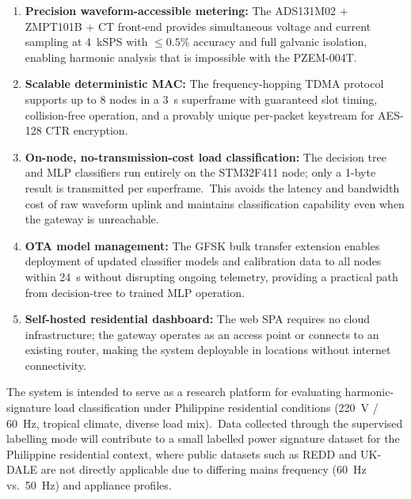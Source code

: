 \documentclass[conference]{IEEEtran}
\begin{document}
\begin{enumerate}
  \item \textbf{Precision waveform-accessible metering:} The
        ADS131M02 + ZMPT101B + CT front-end provides simultaneous
        voltage and current sampling at 4~kSPS with \(\le 0.5\%\)
        accuracy and full galvanic isolation, enabling harmonic analysis
        that is impossible with the PZEM-004T.

  \item \textbf{Scalable deterministic MAC:} The frequency-hopping
        TDMA protocol supports up to 8 nodes in a 3~s superframe with
        guaranteed slot timing, collision-free operation, and a
        provably unique per-packet keystream for AES-128 CTR
        encryption.

  \item \textbf{On-node, no-transmission-cost load classification:}
        The decision tree and MLP classifiers run entirely on the
        STM32F411 node; only a 1-byte result is transmitted per
        superframe.\ This avoids the latency and bandwidth cost of
        raw waveform uplink and maintains classification capability
        even when the gateway is unreachable.

  \item \textbf{OTA model management:} The GFSK bulk transfer
        extension enables deployment of updated classifier models and
        calibration data to all nodes within 24~s without disrupting
        ongoing telemetry, providing a practical path from
        decision-tree to trained MLP operation.

  \item \textbf{Self-hosted residential dashboard:} The web SPA
        requires no cloud infrastructure; the gateway operates as an
        access point or connects to an existing router, making the
        system deployable in locations without internet connectivity.
\end{enumerate}

The system is intended to serve as a research platform for evaluating
harmonic-signature load classification under Philippine residential
conditions (220~V / 60~Hz, tropical climate, diverse load mix).\ Data
collected through the supervised labelling mode will contribute to a
small labelled power signature dataset for the Philippine residential
context, where public datasets such as REDD \cite{kolter_redd_2011}
and UK-DALE \cite{kelly_neural_nilm_2015} are not directly applicable
due to differing mains frequency (60~Hz vs.\ 50~Hz) and appliance
profiles.
\end{document}

